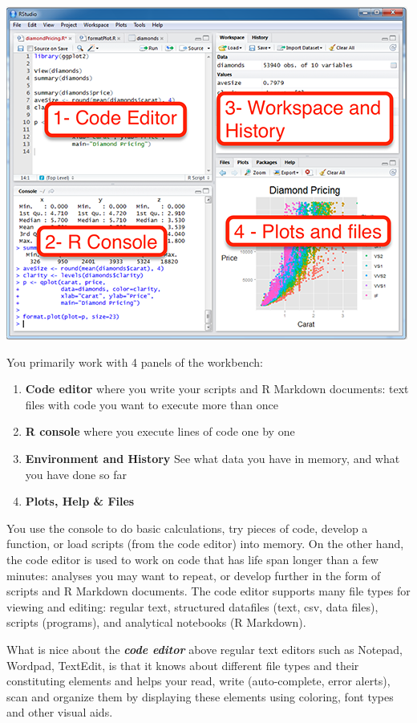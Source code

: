 \documentclass[]{book}
\providecommand{\tightlist}{%
  \setlength{\itemsep}{0pt}\setlength{\parskip}{0pt}}
\begin{document}
\includegraphics{figures/RStudio_screen3.png}

You primarily work with 4 panels of the workbench:

\begin{enumerate}
\def\labelenumi{\arabic{enumi}.}
\tightlist
\item
  \textbf{Code editor} where you write your scripts and R Markdown documents: text files with code you want to execute more than once
\item
  \textbf{R console} where you execute lines of code one by one
\item
  \textbf{Environment and History} See what data you have in memory, and what you have done so far
\item
  \textbf{Plots, Help \& Files}
\end{enumerate}

You use the console to do basic calculations, try pieces of code, develop a function, or load scripts (from the code editor) into memory. On the other hand, the code editor is used to work on code that has life span longer than a few minutes: analyses you may want to repeat, or develop further in the form of scripts and R Markdown documents.
The code editor supports many file types for viewing and editing: regular text, structured datafiles (text, csv, data files), scripts (programs), and analytical notebooks (R Markdown).

What is nice about the \textbf{\emph{code editor}} above regular text editors such as Notepad, Wordpad, TextEdit, is that it knows about different file types and their constituting elements and helps your read, write (auto-complete, error alerts), scan and organize them by displaying these elements using coloring, font types and other visual aids.
\end{document}
